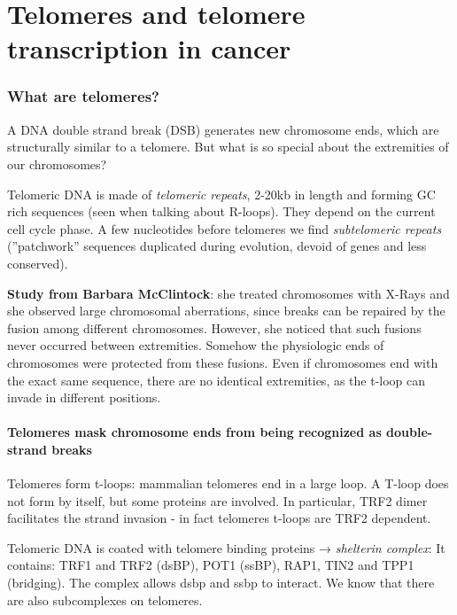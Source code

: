 \graphicspath{{chapters/_resources/}}

\chapter{Telomeres and telomere transcription in cancer}

\hypertarget{what-are-telomeres}{%
\subsection{What are telomeres?}\label{what-are-telomeres}}

A DNA double strand break (DSB) generates new chromosome ends, which are
structurally similar to a telomere. But what is so special about the
extremities of our chromosomes?

Telomeric DNA is made of \emph{telomeric repeats}, 2-20kb in length and
forming GC rich sequences (seen when talking about R-loops). They depend
on the current cell cycle phase. A few nucleotides before telomeres we
find \emph{subtelomeric repeats} (''patchwork'' sequences duplicated
during evolution, devoid of genes and less conserved).

\textbf{Study from Barbara McClintock}: she treated chromosomes with
X-Rays and she observed large chromosomal aberrations, since breaks can
be repaired by the fusion among different chromosomes. However, she
noticed that such fusions never occurred between extremities. Somehow
the physiologic ends of chromosomes were protected from these fusions.
Even if chromosomes end with the exact same sequence, there are no
identical extremities, as the t-loop can invade in different positions.

\hypertarget{telomeres-mask-chromosome-ends-from-being-recognized-as-double-strand-breaks}{%
\subsubsection{Telomeres mask chromosome ends from being recognized as
double-strand
breaks}\label{telomeres-mask-chromosome-ends-from-being-recognized-as-double-strand-breaks}}

Telomeres form t-loops: mammalian telomeres end in a large loop. A
T-loop does not form by itself, but some proteins are involved. In
particular, TRF2 dimer facilitates the strand invasion - in fact
telomeres t-loops are TRF2 dependent.

Telomeric DNA is coated with telomere binding proteins → \emph{shelterin
complex}: It contains: TRF1 and TRF2 (dsBP), POT1 (ssBP), RAP1, TIN2 and
TPP1 (bridging). The complex allows dsbp and ssbp to interact. We know
that there are also subcomplexes on telomeres.

